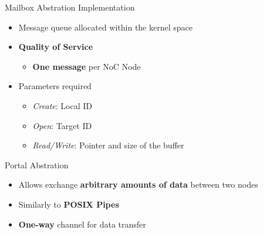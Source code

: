		\begin{frame}[fragile]{Mailbox Abstration Implementation}
			\begin{itemize}
				\item Message queue allocated within the kernel space
				\item \textbf{Quality of Service}
				\begin{itemize}
					\item \textbf{One message} per NoC Node
				\end{itemize}
				\item Parameters required
				\begin{itemize}
					\item \textit{Create}: Local ID
					\item \textit{Open}: Target ID
					\item \textit{Read/Write}: Pointer and size of the buffer
				\end{itemize}
			\end{itemize}


			
		\end{frame}

		\begin{frame}[fragile]{Portal Abstration}
			\begin{itemize}
				\item Allows exchange \textbf{arbitrary amounts of data} between two nodes
				\item Similarly to \textbf{POSIX Pipes}
				\item \textbf{One-way} channel for data transfer
			\end{itemize}


		\end{frame}

